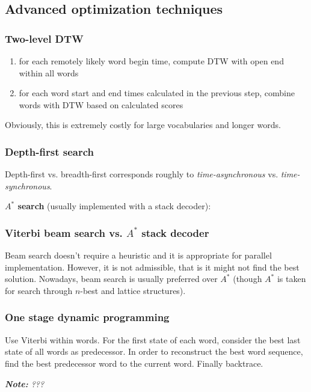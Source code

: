\documentclass[11pt]{article}
\begin{document}
\subsection{Advanced optimization techniques}

\subsubsection{Two-level DTW}
\begin{enumerate}
    \item for each remotely likely word begin time, compute DTW with open end within all words
    \item for each word start and end times calculated in the previous step, combine words with DTW based on calculated scores
\end{enumerate}

Obviously, this is extremely costly for large vocabularies and longer words.

\subsubsection{Depth-first search}

Depth-first vs. breadth-first corresponds roughly to \textit{time-asynchronous} vs. \textit{time-synchronous}.

\textbf{$A^{\ast}$ search} (usually implemented with a stack decoder):

\subsubsection{Viterbi beam search vs. $A^{\ast}$ stack decoder}
Beam search doesn't require a heuristic and it is appropriate for parallel implementation. However, it is not admissible, that is it might not find the best solution. Nowadays, beam search is usually preferred over $A^{\ast}$ (though $A^{\ast}$ is taken for search through $n$-best and lattice structures).

\subsubsection{One stage dynamic programming}
Use Viterbi within words. For the first state of each word, consider the best last state of all words as predecessor. In order to reconstruct the best word sequence, find the best predecessor word to the current word. Finally backtrace.

\textit{\textbf{Note:} ???}
\end{document}
